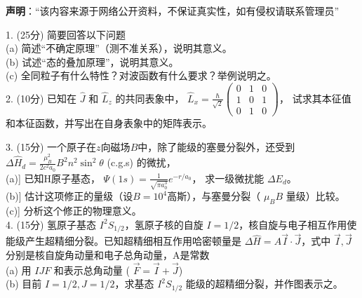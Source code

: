 
\textbf{声明}：“该内容来源于网络公开资料，不保证真实性，如有侵权请联系管理员”



1. (25分) 简要回答以下问题\\
(a) 简述“不确定原理”（测不准关系），说明其意义。\\
(b) 试述“态的叠加原理”，说明其意义。\\
(c) 全同粒子有什么特性？对波函数有什么要求？举例说明之。\\

2. (10分) 已知在 $\hat{J}$ 和 $\hat{L}_z$ 的共同表象中， $\hat{L}_x = \frac{\hbar}{\sqrt{2}} \begin{pmatrix} 
0 & 1 & 0 \\
1 & 0 & 1 \\
0 & 1 & 0 
\end{pmatrix}$， 试求其本征值和本征函数，并写出在自身表象中的矩阵表示。

3. (15分) 一个原子在$z$向磁场$B$中，除了能级的塞曼分裂外，还受到 $\Delta \hat{H}_d = \frac{\mu_B^2}{2c^2a_0} B^2 n^2 \sin^2 \theta$ (c.g.s) 的微扰，\\
(a)] 已知H原子基态， $\Psi (1s) = \frac{1}{\sqrt{\pi a_0^3}} e^{-r/a_0}$， 求一级微扰能 $ \Delta E_d$。\\
(b)] 估计这项修正的量级（设$B=10^4$高斯），与塞曼分裂（ $\mu_B B$ 量级）比较。\\
(c)] 分析这个修正的物理意义。\\

4. (15分) 氢原子基态 $I^2S_{1/2}$，氢原子核的自旋 $I=1/2$，核自旋与电子相互作用使能级产生超精细分裂。已知超精细相互作用哈密顿量是 $\Delta\hat H = A \vec{I} \cdot \vec{J}$，式中 $\vec{I}, \vec{J}$ 分别是核自旋角动量和电子总角动量，A是常数\\
(a) 用 $I J F$ 和表示总角动量 ( $\vec{F} = \vec{I} + \vec{J}$)\\
(b) 目前 $I = 1/2, J = 1/2$，求基态 $I^2S_{1/2}$ 能级的超精细分裂，并作图表示之。\\

